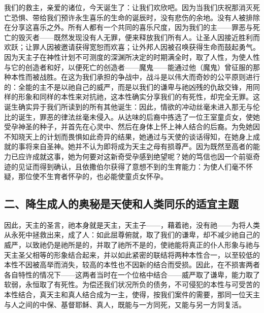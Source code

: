 我们的救主，亲爱的诸位，今天诞生了：让我们欢欣吧。因为当我们庆祝那消灭死亡恐惧、带给我们预许永生喜乐的生命的诞辰时，没有悲伤的余地。没有人被排除在分享这喜乐之外。所有人都有一个共同的喜乐尺度，因为我们的主——罪恶与死亡的毁灭者——既然发现没有人无罪，便来释放我们所有人。让圣人因接近胜利而欢跃；让罪人因被邀请获得宽恕而欢喜；让外邦人因被召唤获得生命而鼓起勇气。因为天主子在神性计划不可测度的深渊所决定的时期满全时，取了人性，为使人性与它的创造者和好，以便死亡的创造者——魔鬼——能通过他（魔鬼）曾征服的那种本性而被战胜。在这为我们承担的争战中，战斗是以伟大而奇妙的公平原则进行的：全能的主不是以祂自己的威严，而是以我们的谦卑与祂凶残的仇敌交锋，用同样的形象和同样的本性来对抗祂，这本性确实分享我们的有死性，却完全无罪。这诞生确实异于我们所读到的所有其他诞生：因此，情欲的冲动丝毫未进入那无与伦比的诞生，罪恶的律法丝毫未侵入。从达味的后裔中拣选了一位王室童贞女，使她受孕神圣的种子，并首先在心灵中、然后在身体上怀上神人结合的后裔。为免她因不知晓天上的计划而畏惧如此奇异的结果，她通过与天使的谈话得知，在她身上成就的事将来自圣神。她并不认为即将成为天主之母有损尊严。因为既然至高者的能力已应许成就这事，她为何要对这新奇受孕感到绝望呢？她的笃信也因一个前驱奇迹的见证而得到确认，且依撒伯尔获得了意想不到的生育能力：为使人们毫不怀疑，那位使不生育者怀孕的，也必能使童贞女怀孕。\par


\subsection{二、降生成人的奥秘是天使和人类同乐的适宜主题}

因此，天主的圣言，祂本身就是天主，天主子——，藉着祂，没有祂——为将人类从永死中拯救出来，成了人：如此屈尊俯就，取了我们的谦卑，却不减少祂自己的威严，以致祂仍是祂所是的，并取了祂所不是的，使祂能将真正的仆人形象与祂与天主圣父相等的形象结合起来，并以如此紧密的联结将两种本性合一，以至较低的本性不因被高举而消失，较高的本性也不因新的结合而受损。因此，在不损害两者各自特性的情况下——这两者当时在一个位格中结合——威严取了谦卑，能力取了软弱，永恒取了有死性。为偿还我们状况所负的债务，不可侵犯的本性与可受苦的本性结合，真天主和真人结合成为一主，使得，按我们案件的需要，那同一位天主与人之间的中保、基督耶稣、真人，既能与一方同死，又能与另一方同复活。\par

